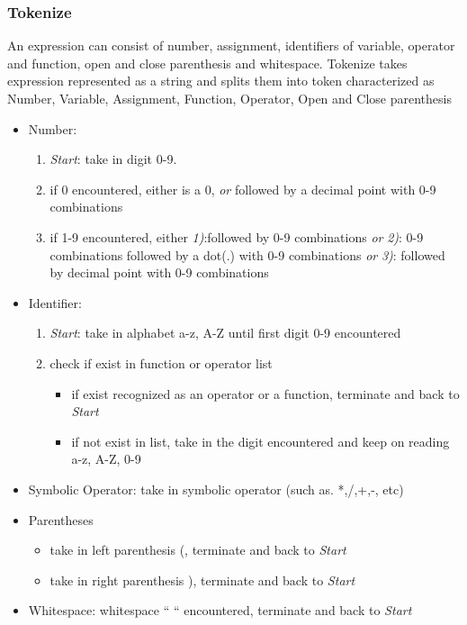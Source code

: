 \documentclass[12pt,a4paper]{article}
\begin{document}
\subsubsection{Tokenize}
\textnormal{An expression can consist of number, assignment, identifiers of variable, operator and function, open and close parenthesis and whitespace. Tokenize takes expression represented as a string and splits them into token characterized as Number, Variable, Assignment, Function, Operator, Open and Close parenthesis}
\begin{itemize}
\item Number:
\begin {enumerate}
\item \emph{Start}: take in digit 0-9.
\item if 0 encountered, either is a 0, \emph{or} followed by a decimal point with 0-9 combinations
\item if 1-9 encountered, either \emph{1)}:followed by 0-9 combinations \emph{or} \emph{2)}: 0-9 combinations followed by a dot(.) with 0-9 combinations \emph{or} \emph{3)}: followed by decimal point with 0-9 combinations
\end{enumerate}
\item Identifier:
\begin {enumerate}
\item \emph{Start}: take in alphabet a-z, A-Z until first digit 0-9 encountered
\item check if exist in function or operator list
\begin {itemize}
\item if exist recognized as an operator or a function, terminate and back to \emph{Start}
\item if not exist in list, take in the digit encountered and keep on reading a-z, A-Z, 0-9
\end{itemize}
\end{enumerate}
\item Symbolic Operator: take in symbolic operator (such as. *,/,+,-, etc)
\item Parentheses
\begin{itemize}
\item take in left parenthesis (, terminate and back to \emph{Start}
\item take in right parenthesis ), terminate and back to \emph{Start}
\end{itemize}
\item Whitespace: whitespace “ “ encountered, terminate and back to \emph{Start}
  
\end{itemize}
\end{document}
